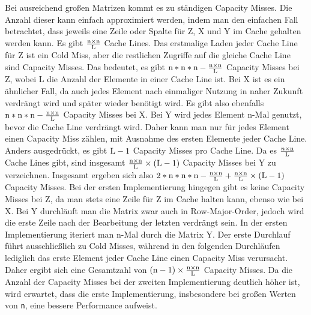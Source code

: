 \documentclass[sigconf,language=english]{acmart}
\begin{document}
Bei ausreichend großen Matrizen kommt es zu ständigen Capacity Misses. 
Die Anzahl dieser kann einfach approximiert werden, 
indem man den einfachen Fall betrachtet, 
dass jeweils eine Zeile oder Spalte für Z, X und Y im Cache gehalten werden kann.
Es gibt $ \frac{\textnormal{n} \times \textnormal{n}}{\textnormal{L}} $ Cache Lines. 
Das erstmalige Laden jeder Cache Line für Z ist ein Cold Miss, 
aber die restlichen Zugriffe auf die gleiche Cache Line sind Capacity Misses. 
Das bedeutet, es gibt $\textnormal{n} * \textnormal{n} * \textnormal{n} - \frac{\textnormal{n} \times \textnormal{n}}{\textnormal{L}} $ 
Capacity Misses bei Z, wobei L die Anzahl der Elemente 
in einer Cache Line ist.
Bei X ist es ein ähnlicher Fall, da auch jedes Element nach einmaliger Nutzung in naher Zukunft verdrängt wird 
und später wieder benötigt wird. 
Es gibt also ebenfalls 
$\textnormal{n} * \textnormal{n} * \textnormal{n} - \frac{\textnormal{n} \times \textnormal{n}}{\textnormal{L}} $ 
Capacity Misses bei X.
Bei Y wird jedes Element n-Mal genutzt, bevor die Cache Line verdrängt wird. 
Daher kann man nur für jedes Element einen Capacity Miss zählen, 
mit Ausnahme des ersten Elemente jeder Cache Line. Anders ausgedrückt, 
es gibt $\textnormal{L} - 1 $ Capacity Misses pro Cache Line. 
Da es $ \frac{n \times \textnormal{n}}{\textnormal{L}} $ Cache Lines gibt, 
sind insgesamt $ \frac{\textnormal{n} \times \textnormal{n}}{\textnormal{L}} \times (\textnormal{L} - 1) $ Capacity Misses bei Y zu verzeichnen.
Insgesamt ergeben sich also 
$2 * \textnormal{n} * \textnormal{n} * \textnormal{n} - \frac{\textnormal{n} \times \textnormal{n}}{\textnormal{L}} + \frac{\textnormal{n} \times \textnormal{n}}{\textnormal{L}} \times (\textnormal{L} - 1) $ Capacity Misses.
Bei der ersten Implementierung hingegen gibt es keine Capacity Misses bei Z, 
da man stets eine Zeile für Z im Cache halten kann, ebenso wie bei X. 
Bei Y durchläuft man die Matrix zwar auch in Row-Major-Order, 
jedoch wird die erste Zeile nach der Bearbeitung der letzten verdrängt sein.
In der ersten Implementierung iteriert man n-Mal durch die Matrix Y. 
Der erste Durchlauf führt ausschließlich zu Cold Misses, 
während in den folgenden Durchläufen lediglich das erste Element jeder Cache Line einen Capacity Miss verursacht. 
Daher ergibt sich eine Gesamtzahl von $(\textnormal{n}-1) \times \frac{\textnormal{n} \times \textnormal{n}}{\textnormal{L}} $ Capacity Misses. 
Da die Anzahl der Capacity Misses bei der zweiten Implementierung deutlich höher ist, 
wird erwartet, dass die erste Implementierung, 
insbesondere bei großen Werten von \texttt{n}, eine bessere Performance aufweist.
\end{document}
